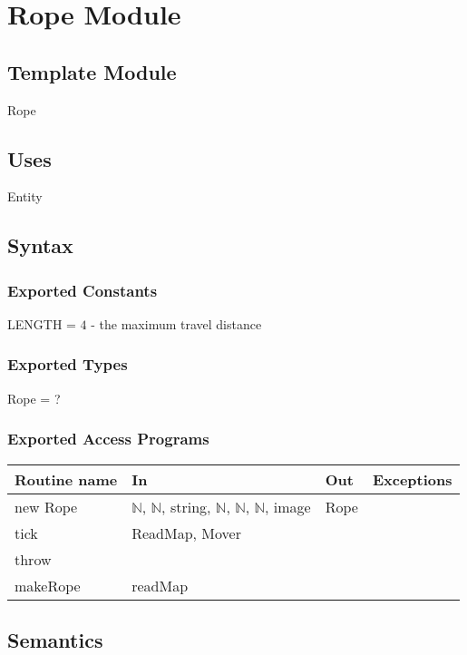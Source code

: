\documentclass[12pt]{article}
\begin{document}
\newpage

\section*{Rope Module}

\subsection*{Template Module}

Rope

\subsection*{Uses}

Entity

\subsection*{Syntax}

\subsubsection*{Exported Constants}

LENGTH = $4$ - the maximum travel distance

\subsubsection*{Exported Types}

Rope = ?

\subsubsection*{Exported Access Programs}

\begin{tabular}{| l | l | l | l |}
\hline
\textbf{Routine name} & \textbf{In} & \textbf{Out} & \textbf{Exceptions}\\
\hline
new Rope & $\mathbb{N}$, $\mathbb{N}$, string, $\mathbb{N}$, $\mathbb{N}$, $\mathbb{N}$, image & Rope & ~\\
\hline
tick & ReadMap, Mover & ~ & ~\\
\hline
throw & ~ & ~ & ~\\
\hline
makeRope & readMap & ~ & ~\\
\hline
\end{tabular}

\subsection*{Semantics}
\end{document}
